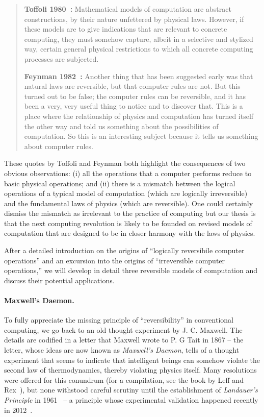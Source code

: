\documentclass{article}
\begin{document}
\begin{quote}
  \textbf{Toffoli 1980~\cite{Toffoli:1980}:} Mathematical models of
  computation are abstract constructions, by their nature unfettered
  by physical laws. However, if these models are to give indications
  that are relevant to concrete computing, they must somehow capture,
  albeit in a selective and stylized way, certain general physical
  restrictions to which all concrete computing processes are
  subjected.

  \textbf{Feynman 1982~\cite{springerlink:10.1007/BF02650179}:}
  Another thing that has been suggested early was that natural laws
  are reversible, but that computer rules are not. But this turned out
  to be false; the computer rules can be reversible, and it has been a
  very, very useful thing to notice and to discover that. This is a
  place where the relationship of physics and computation has turned
  itself the other way and told us something about the possibilities
  of computation. So this is an interesting subject because it tells
  us something about computer rules.
\end{quote}

\noindent These quotes by Toffoli and Feynman both highlight the
consequences of two obvious observations: (i) all the operations that
a computer performs reduce to basic physical operations; and (ii)
there is a mismatch between the logical operations of a typical model
of computation (which are logically irreversible) and the fundamental
laws of physics (which are reversible). One could certainly dismiss
the mismatch as irrelevant to the practice of computing but our thesis
is that the next computing revolution is likely to be founded on
revised models of computation that are designed to be in closer harmony
with the laws of physics.

After a detailed introduction on the origins of ``logically
reversibile computer operations'' and an excursion into the origins of
``irreversible computer operations,'' we will develop in detail three
reversible models of computation and discuss their potential
applications.

\paragraph*{Maxwell's Daemon.}
To fully appreciate the missing principle of ``reversibility'' in
conventional computing, we go back to an old thought experiment by
J. C. Maxwell. The details are codified in a letter that Maxwell wrote
to P. G Tait in 1867 -- the letter, whose ideas are now known as
\emph{Maxwell's Daemon}, tells of a thought experiment that seems to
indicate that intelligent beings can somehow violate the second law of
thermodynamics, thereby violating physics itself. Many resolutions
were offered for this conundrum (for a compilation, see the book by
Leff and Rex~\cite{leff1990}), but none withstood careful scrutiny
until the establishment of \emph{Landauer's Principle} in
1961~\cite{Landauer:1961} -- a principle whose experimental validation
happened recently in 2012~\cite{berut2012experimental}.
\end{document}
